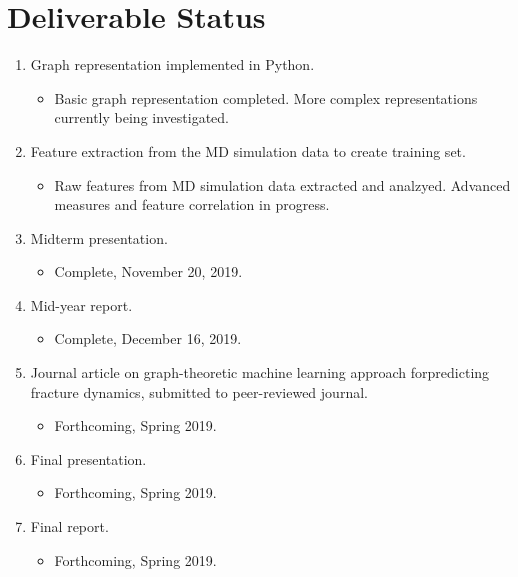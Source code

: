 \section{Deliverable Status}
\begin{enumerate}
\item Graph representation implemented in Python.
	\begin{itemize}
		\item Basic graph representation completed. More complex representations currently being investigated. 
	\end{itemize} 
\item Feature extraction from the MD simulation data to create training set.
	\begin{itemize}
		\item Raw features from MD simulation data extracted and analzyed. Advanced measures and feature correlation in progress. 
	\end{itemize} 
\item Midterm presentation.
	\begin{itemize}
		\item Complete, November 20, 2019.
	\end{itemize} 
\item Mid-year report.
	\begin{itemize}
		\item Complete, December 16, 2019.
	\end{itemize} 
\item  Journal  article  on  graph-theoretic  machine  learning  approach  forpredicting fracture dynamics, submitted to peer-reviewed journal.
	\begin{itemize}
		\item Forthcoming, Spring 2019.
	\end{itemize} 
\item Final presentation.
	\begin{itemize}
		\item Forthcoming, Spring 2019.
	\end{itemize} 
\item Final report.
	\begin{itemize}
		\item Forthcoming, Spring 2019.
	\end{itemize} 
\end{enumerate}

\iffalse
